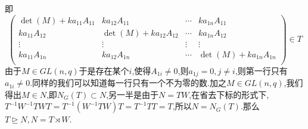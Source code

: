 \documentclass[b5paper]{ctexart}
\begin{document}
即
\[\left( \begin{array}{cccc}
\det(M)+ka_{11}A_{11} & ka_{12}A_{11} & \cdots & ka_{1n}A_{11}\\
ka_{11}A_{12} & \det(M)+ka_{12}A_{12} & \cdots & ka_{1n}A_{12}\\
\vdots & \vdots & \vdots & \vdots\\
ka_{11}A_{1n} & ka_{12}A_{1n} & \cdots & \det(M)+ka_{1n}A_{1n}\\
\end{array}\right) \in T\]
由于$M\in GL(n,q)$于是存在某个$i$,使得$A_{1i}\neq 0$,则$a_{1j}=0,j\neq i$,则第一行只有$a_{1i}\neq 0$.同样的我们可以知道每一行只有一个不为零的数.加之$M\in GL(n,q)$,我们得出$M\in N$,即$N_{G}(T)\subset N$,另一半是由于$N=TW$,在省去下标的形式下,$T^{-1}W^{-1}TWT=T^{-1}(W^{-1}TW)T=T^{-1}TT=T$,所以$N=N_{G}(T)$.那么$T\trianglerighteq N,N=T\rtimes W$.
\end{document}
